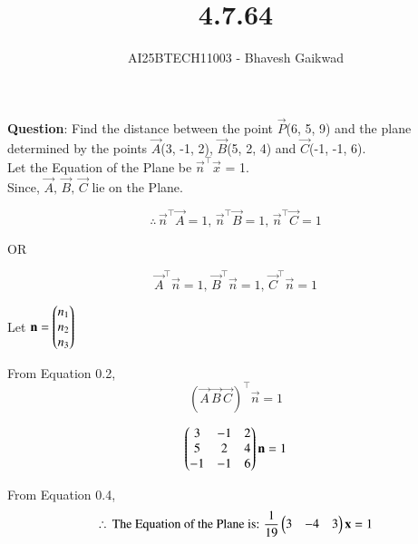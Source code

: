 \documentclass[journal]{IEEEtran}
\begin{document}

\vspace{3cm}

\title{4.7.64}
\author{AI25BTECH11003 - Bhavesh Gaikwad}
{\let\newpage\relax\maketitle}

\renewcommand{\thefigure}{\theenumi}
\renewcommand{\thetable}{\theenumi}
\setlength{\intextsep}{10pt} 


\renewcommand{\thetable}{\theenumi}


\textbf{Question}: Find the distance between the point $\vec{P}$(6, 5, 9) and the plane determined by the points $\vec{A}$(3, -1, 2), $\vec{B}$(5, 2, 4) and $\vec{C}$(-1, -1, 6). \\


\solution
Let the Equation of the Plane be $\vec{n}^\top\vec{x}$ = 1.\\

Since, $\vec{A}, \, \vec{B}, \, \vec{C}$ lie on the Plane.

\begin{equation}
    \therefore \, \vec{n}^\top\vec{A}=1, \, \vec{n}^\top\vec{B}=1,  \, \vec{n}^\top\vec{C}=1
\end{equation}

\begin{center}
    OR
\end{center}

\begin{equation}
    \vec{A}^\top\vec{n}=1, \, \vec{B}^\top\vec{n}=1, \, \vec{C}^\top\vec{n}=1
\end{equation}

Let $\mathbf{n} = \begin{pmatrix}n_1 \\ n_2 \\ n_3\end{pmatrix}$

From Equation 0.2,
\begin{equation}
    (\vec{A} \, \vec{B} \, \vec{C})^\top \vec{n}=1
\end{equation}

\begin{equation}
\begin{pmatrix}3 & -1 & 2 \\ 5 & 2 & 4\\ -1 & -1 & 6\end{pmatrix}\mathbf{n} = 1
\end{equation}


From Equation 0.4,
\begin{equation}
\therefore \, \text{The Equation of the Plane is: } \dfrac{1}{19}\begin{pmatrix}3 & -4 & 3\end{pmatrix}\mathbf{x} = 1
\end{equation}\\
\end{document}
